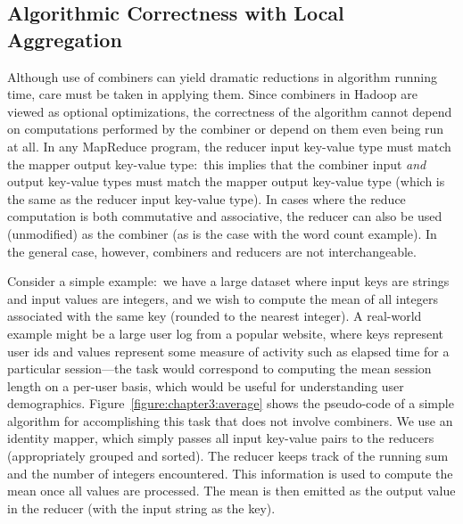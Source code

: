 \subsection{Algorithmic Correctness with Local Aggregation}
\label{chapter3:local-aggregation:correctness}

Although use of combiners can yield dramatic reductions in algorithm
running time, care must be taken in applying them.  Since combiners in
Hadoop are viewed as optional optimizations, the correctness of the
algorithm cannot depend on computations performed by the combiner or
depend on them even being run at all.  In any MapReduce program, the
reducer input key-value type must match the mapper output key-value
type:\ this implies that the combiner input \emph{and} output key-value
types must match the mapper output key-value type (which is the same
as the reducer input key-value type).  In cases where the reduce
computation is both commutative and associative, the reducer can also
be used (unmodified) as the combiner (as is the case with the word
count example).  In the general case, however, combiners and reducers
are not interchangeable.

Consider a simple example:\ we have a large dataset where input keys
are strings and input values are integers, and we wish to compute the
mean of all integers associated with the same key (rounded to the
nearest integer).  A real-world example might be a large user log from
a popular website, where keys represent user ids and values represent
some measure of activity such as elapsed time for a particular
session---the task would correspond to computing the mean session
length on a per-user basis, which would be useful for understanding
user demographics.  Figure~\ref{figure:chapter3:average} shows the
pseudo-code of a simple algorithm for accomplishing this task that
does not involve combiners.  We use an identity mapper, which simply
passes all input key-value pairs to the reducers (appropriately
grouped and sorted).  The reducer keeps track of the running sum and
the number of integers encountered.  This information is used to
compute the mean once all values are processed.  The mean is then
emitted as the output value in the reducer (with the input string as
the key).

